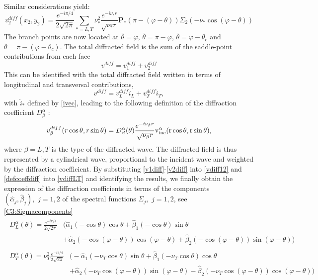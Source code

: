 ~\\
\hspace*{1em} Similar considerations yield:
\begin{equation}
v_2^{diff}(x_2,y_2)=\frac{e^{-i\pi/4}}{2\sqrt{2\pi}}\sum_{*=L,T}\nu_*^2\frac{e^{-i\nu_*r}}{\sqrt{\nu_*r}}\mathbf{P_*}(\pi-(\varphi-\theta))\Sigma_2(-\nu_*\cos(\varphi-\theta))
\label{v2diff}
\end{equation}
The branch points are now located at $\bar{\theta}=\varphi$, $\bar{\theta}=\pi-\varphi$, $\bar{\theta}=\varphi-\theta_c$ and $\bar{\theta}=\pi-(\varphi-\theta_c)$.
The total diffracted field is the sum of the saddle-point contributions from each face
\begin{equation}
v^{diff}=v_1^{diff}+v_2^{diff}
\label{vdiff12}
\end{equation}
This can be identified with the total diffracted field written in terms of longitudinal and transversal contributions, 
\begin{equation}
v^{diff}=v^{diff}_L \hat{i}_L+v^{diff}_T \hat{i}_T,
\label{vdiffLT}
\end{equation}
with $\hat{i}_*$ defined by \eqref{ivec}, leading to the following definition of the diffraction coefficient $D_{\beta}^{\alpha}$ : 
\begin{equation}
v_{\beta}^{diff}(r\cos\theta,r\sin\theta)=D_{\beta}^{\alpha}(\theta)\frac{e^{-i\nu_{\beta}r}}{\sqrt{\nu_{\beta}r}} \rm v^{\alpha}_{inc}(r\cos\theta,r\sin\theta),
\label{defcoeffdiff}
\end{equation}
where $\beta=L,T$ is the type of the diffracted wave. The diffracted field is thus represented by a cylindrical wave, proportional to the incident wave and weighted by the diffraction coefficient. By substituting \eqref{v1diff}-\eqref{v2diff} into \eqref{vdiff12} and \eqref{defcoeffdiff} into \eqref{vdiffLT} and identifying the results, we finally obtain the expression of the diffraction coefficients in terms of the components $(\hat{\alpha}_j,\hat{\beta}_j), \, \, j=1,2$ of the spectral functions $\Sigma_j, \, \, j=1,2$, see \eqref{C3:Sigmacomponents}
\begin{gather}
\begin{split}
 D^{\alpha}_L(\theta)=\frac{e^{-i\pi/4}}{2\sqrt{2\pi}}&\big(\hat{\alpha}_1(-\cos\theta)\cos\theta+\hat{\beta}_1(-\cos\theta)\sin\theta\\
&+\hat{\alpha}_2(-\cos(\varphi-\theta))\cos(\varphi-\theta)+\hat{\beta}_2(-\cos(\varphi-\theta))\sin(\varphi-\theta)\big)
\end{split} \label{DL}\\
\begin{split}
 D^{\alpha}_T(\theta)=\nu_T^2\frac{e^{-i\pi/4}}{2\sqrt{2\pi}}&\big(-\hat{\alpha}_1(-\nu_T\cos\theta)\sin\theta+\hat{\beta}_1(-\nu_T\cos\theta)\cos\theta\\
&+\hat{\alpha}_2(-\nu_T\cos(\varphi-\theta))\sin(\varphi-\theta)-\hat{\beta}_2(-\nu_T\cos(\varphi-\theta))\cos(\varphi-\theta)\big) 
\end{split} \label{DT}
\end{gather}

